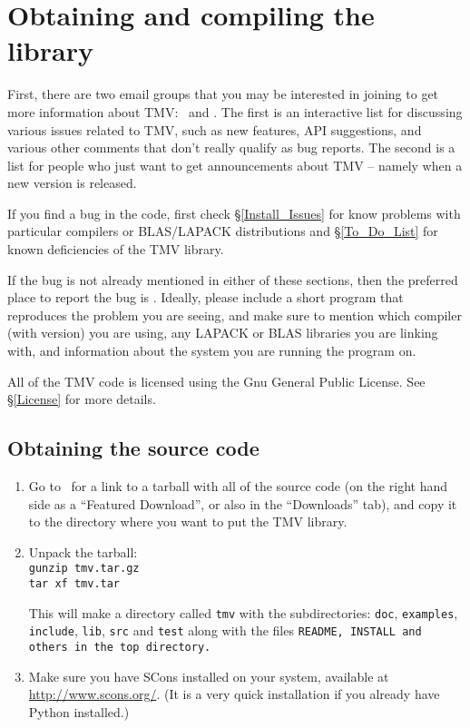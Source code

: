 
\section{Obtaining and compiling the library}
\label{Install}

First, there are two email groups that you may be interested in joining to get more 
information about TMV:
\mygrouptt\ and \mygroupann.
The first is an interactive list for discussing various issues related to TMV, such as 
new features, API suggestions, and various other comments that don't really qualify
as bug reports.  The second is a list for people who just want to get announcements 
about TMV -- namely when a new version is released.

If you find a bug in the code, first check \S\ref{Install_Issues} for know problems with 
particular compilers or BLAS/LAPACK distributions and \S\ref{To_Do_List} for known
deficiencies of the TMV library.

If the bug is not already mentioned in either of these sections, then the preferred place 
to report the bug is \myissues. 
Ideally, please include a short program that reproduces the problem
you are seeing, and make sure to mention which compiler (with version) you are using,
any LAPACK or BLAS libraries you are linking with, and information about the system 
you are running the program on. 

All of the TMV code is licensed using the Gnu General Public License.  See 
\S\ref{License} for more details.

\subsection{Obtaining the source code}
\label{Install_Obtain}


\begin{enumerate}

\item
Go to \website\ for a link to a tarball with all of the source code (on the right hand side as a
``Featured Download'', or also in the ``Downloads'' tab), and copy
it to the directory where you want to put the TMV library.

\item
Unpack the tarball:\\
\texttt{gunzip tmv\tmvversion .tar.gz}\\
\texttt{tar xf tmv\tmvversion .tar}

This will make a directory called \texttt{tmv\tmvversion} with the subdirectories:
\texttt{doc}, \texttt{examples}, \texttt{include}, \texttt{lib}, \texttt{src} and \texttt{test} 
along with the files \tt{README}, \tt{INSTALL} and others
in the top directory.

\item Make sure you have SCons installed on your system,  
available at \url{http://www.scons.org/}.  (It is a
very quick installation if you already have Python installed.)

\end{enumerate}

